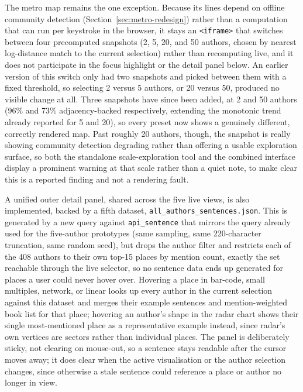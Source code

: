 \documentclass[logo,msc]{infthesis}
\begin{document}
The metro map remains the one exception. Because its lines depend on offline community detection (Section~\ref{sec:metro-redesign}) rather than a computation that can run per keystroke in the browser, it stays an \texttt{<iframe>} that switches between four precomputed snapshots (2, 5, 20, and 50 authors, chosen by nearest log-distance match to the current selection) rather than recomputing live, and it does not participate in the focus highlight or the detail panel below. An earlier version of this switch only had two snapshots and picked between them with a fixed threshold, so selecting 2 versus 5 authors, or 20 versus 50, produced no visible change at all. Three snapshots have since been added, at 2 and 50 authors (96\% and 73\% adjacency-backed respectively, extending the monotonic trend already reported for 5 and 20), so every preset now shows a genuinely different, correctly rendered map. Past roughly 20 authors, though, the snapshot is really showing community detection degrading rather than offering a usable exploration surface, so both the standalone scale-exploration tool and the combined interface display a prominent warning at that scale rather than a quiet note, to make clear this is a reported finding and not a rendering fault.

A unified outer detail panel, shared across the five live views, is also implemented, backed by a fifth dataset, \texttt{all\_authors\_sentences.json}. This is generated by a new query against \texttt{api\_sentence} that mirrors the query already used for the five-author prototypes (same sampling, same 220-character truncation, same random seed), but drops the author filter and restricts each of the 408 authors to their own top-15 places by mention count, exactly the set reachable through the live selector, so no sentence data ends up generated for places a user could never hover over. Hovering a place in bar-code, small multiples, network, or linear looks up every author in the current selection against this dataset and merges their example sentences and mention-weighted book list for that place; hovering an author's shape in the radar chart shows their single most-mentioned place as a representative example instead, since radar's own vertices are sectors rather than individual places. The panel is deliberately sticky, not clearing on mouse-out, so a sentence stays readable after the cursor moves away; it does clear when the active visualisation or the author selection changes, since otherwise a stale sentence could reference a place or author no longer in view.
\end{document}

